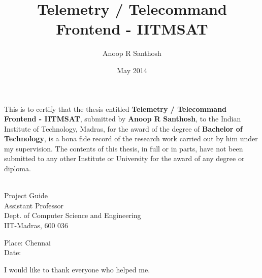 \documentclass[BTech]{iitmdiss}
\def\thesistitle{Telemetry / Telecommand Frontend - IITMSAT}
\def\thesisauthor{Anoop R Santhosh}
\begin{document}


\title{\thesistitle}

\author{\thesisauthor}

\date{May 2014}

\begin{singlespace}
\maketitle 
\end{singlespace} 



\certificate

\vspace*{0.5in}

\noindent This is to certify that the thesis entitled {\bf {\thesistitle}}, 
submitted by {\bf {\thesisauthor}}, to the Indian Institute of Technology, 
Madras, for the award of the degree of {\bf Bachelor of Technology}, 
is a bona fide record of the research work carried out by him under my
supervision. The contents of this thesis, in full or in parts, have not been
submitted to any other Institute or University for the award of any degree or
diploma.

\vspace*{1.4in}
\hspace*{-0.25in}
\begin{singlespace}
 \\
\noindent Project Guide \\ 
\noindent Assistant Professor \\
\noindent Dept. of Computer Science and Engineering\\
\noindent IIT-Madras, 600 036 \\
\end{singlespace}
\vspace*{0.20in}
\noindent Place: Chennai\\ 
Date:

\acknowledgements

I would like to thank everyone who helped me.

\end{document}
